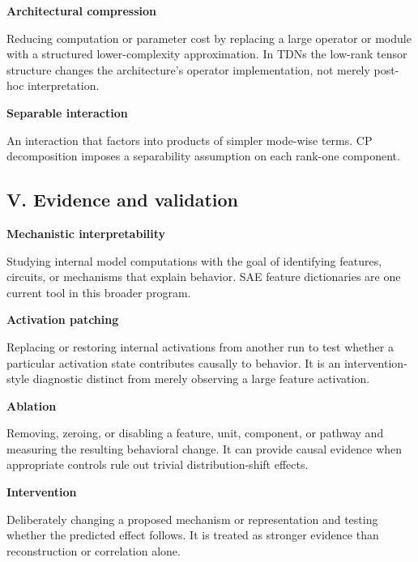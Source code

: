 \documentclass[10pt]{article}
\newenvironment{glossaryentry}[1]{%
  \par\medskip\noindent
  {\large\bfseries #1}\par\smallskip
}{\par\medskip}
\begin{document}
\begin{glossaryentry}{Architectural compression}
Reducing computation or parameter cost by replacing a large operator or module with a structured lower-complexity approximation. In TDNs the low-rank tensor structure changes the architecture's operator implementation, not merely post-hoc interpretation.
\par\smallskip{\small\color{muted}[LIN25]}
\end{glossaryentry}


\begin{glossaryentry}{Separable interaction}
An interaction that factors into products of simpler mode-wise terms. CP decomposition imposes a separability assumption on each rank-one component.
\par\smallskip{\small\color{muted}[KB09, LIN25]}
\end{glossaryentry}


\subsection{V. Evidence and validation}

\begin{glossaryentry}{Mechanistic interpretability}
Studying internal model computations with the goal of identifying features, circuits, or mechanisms that explain behavior. SAE feature dictionaries are one current tool in this broader program.
\par{}
\end{glossaryentry}


\begin{glossaryentry}{Activation patching}
Replacing or restoring internal activations from another run to test whether a particular activation state contributes causally to behavior. It is an intervention-style diagnostic distinct from merely observing a large feature activation.

\end{glossaryentry}


\begin{glossaryentry}{Ablation}
Removing, zeroing, or disabling a feature, unit, component, or pathway and measuring the resulting behavioral change. It can provide causal evidence when appropriate controls rule out trivial distribution-shift effects.

\end{glossaryentry}


\begin{glossaryentry}{Intervention}
Deliberately changing a proposed mechanism or representation and testing whether the predicted effect follows. It is treated as stronger evidence than reconstruction or correlation alone.

\end{glossaryentry}
\end{document}
